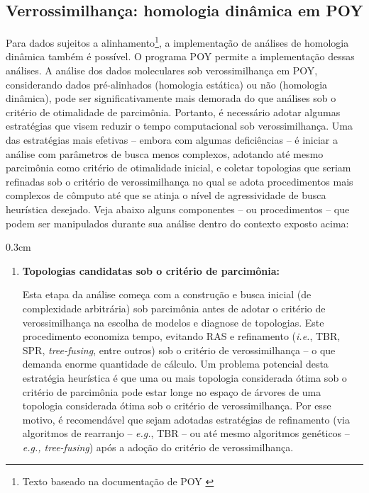 \begin{refsection}
\section{Verrossimilhança: homologia dinâmica em POY}\label{tut13:dynamic} 
 
 Para dados sujeitos a alinhamento\footnote{Texto baseado na documentação de POY \parencite[][]{VaronETAL_2014}}, a implementação de análises de homologia dinâmica também é possível. O programa POY permite a implementação dessas análises. A análise dos dados moleculares sob verossimilhança em POY, considerando dados pré-alinhados (homologia estática) ou não (homologia dinâmica), pode ser significativamente mais demorada do que análises sob o critério de otimalidade de parcimônia. Portanto, é necessário adotar algumas estratégias que visem reduzir o tempo computacional sob verossimilhança. Uma das estratégias mais efetivas -- embora com algumas deficiências -- é iniciar a análise com parâmetros de busca menos complexos, adotando até mesmo parcimônia como critério de otimalidade inicial, e coletar topologias que seriam refinadas sob o critério de verossimilhança no qual se adota procedimentos mais complexos de cômputo até que se atinja o nível de agressividade de busca heurística desejado. Veja abaixo alguns componentes -- ou procedimentos -- que podem ser manipulados durante sua análise dentro do contexto exposto acima:

\begin {myindentpar}{0.3cm}
\begin{enumerate}[\itshape i.]
	\item{\textbf{Topologias candidatas sob o critério de parcimônia:}}\label{tut13:dynamic:par}

Esta etapa da análise começa com a construção e busca inicial (de complexidade arbitrária) sob parcimônia antes de adotar o critério de verossimilhança na escolha de modelos e diagnose de topologias. Este procedimento economiza tempo, evitando RAS e refinamento (\textit{i.e.}, TBR, SPR, \textit{tree-fusing}, entre outros) sob o critério de verossimilhança -- o que demanda enorme quantidade de cálculo. Um problema potencial desta estratégia heurística é que uma ou mais topologia considerada ótima sob o critério de parcimônia pode estar longe no espaço de árvores de uma topologia considerada ótima sob o critério de verossimilhança. Por esse motivo, é recomendável que sejam adotadas estratégias de refinamento (via algoritmos de rearranjo -- \textit{e.g.}, TBR -- ou até mesmo algoritmos genéticos -- \textit{e.g., tree-fusing}) após a adoção do critério de verossimilhança.


\end{enumerate}
\end{myindentpar}
\end{refsection}
